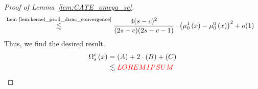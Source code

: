 \begin{proof}[Proof of Lemma~\ref{lem:CATE_omega_sc}]
\begin{equation}
\begin{aligned}
            & \overset{\text{Lem \ref{lem:kernel_prod_dirac_convergence}}}{\lesssim} 
            \frac{4(s-c)^2}{(2s-c)(2s-c-1)} \cdot \left(\mu_{0}^{1}\left(x\right) - \mu_{0}^{0}\left(x\right)\right)^2 + o(1)
		\end{aligned}
	\end{equation}
	Thus, we find the desired result.
	\begin{equation}
		\begin{aligned}
			\Omega_{s}^{c}\left(x\right)
			& = (A) + 2\cdot (B) + (C) \\
			& \lesssim {\color{red} LOREM IPSUM}
		\end{aligned}
	\end{equation}
\end{proof}

